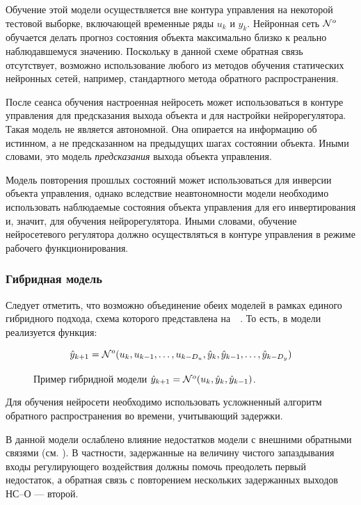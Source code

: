 Обучение этой модели осуществляется вне контура управления на
некоторой тестовой выборке, включающей временные ряды $u_k$ и $y_k$.
Нейронная сеть $\mathcal{N}^o$ обучается делать прогноз состояния
объекта максимально близко к реально наблюдавшемуся значению.
Поскольку в данной схеме обратная связь отсутствует, возможно
использование любого из методов обучения статических нейронных сетей,
например, стандартного метода обратного распространения.

После сеанса обучения настроенная нейросеть может использоваться в
контуре управления для предсказания выхода объекта и для настройки
нейрорегулятора.  Такая модель не является автономной.  Она опирается
на информацию об истинном, а не предсказанном на предыдущих шагах
состоянии объекта.  Иными словами, это модель {\it предсказания
}выхода объекта управления.

Модель повторения прошлых состояний может использоваться для инверсии
объекта управления, однако вследствие неавтономности модели необходимо
использовать наблюдаемые состояния объекта управления для его
инвертирования и, значит, для обучения нейрорегулятора.  Иными
словами, обучение нейросетевого регулятора должно осуществляться в
контуре управления в режиме рабочего функционирования.

\subsubsection{Гибридная модель}

Следует отметить, что возможно объединение обеих моделей в рамках
единого гибридного подхода, схема которого представлена
на~~\cite{park96}.  То есть, в модели
реализуется функция:

\begin{equation}\label{eq:nnp-hybrid}
  \hat{y}_{k+1}=\NN^o(u_k, u_{k-1},\ldots,u_{k-D_u}, \hat{y}_k,
                              \hat{y}_{k-1},\ldots, \hat{y}_{k-D_y})
\end{equation}

\begin{figure}[h]
  \centering
  
  \caption{Пример гибридной модели
  $\hat{y}_{k+1}=\mathcal{N}^o(u_k, \hat{y}_k, \hat{y}_{k-1})$.}
  \label{fig:nnp-hybrid}
\end{figure}

Для обучения нейросети необходимо использовать усложненный алгоритм
обратного распространения во времени, учитывающий задержки.

В данной модели ослаблено влияние недостатков модели с внешними
обратными связями (см. ).  В частности,
задержанные на величину чистого запаздывания входы регулирующего
воздействия должны помочь преодолеть первый недостаток, а обратная
связь с повторением нескольких задержанных выходов НС--О --- второй.

